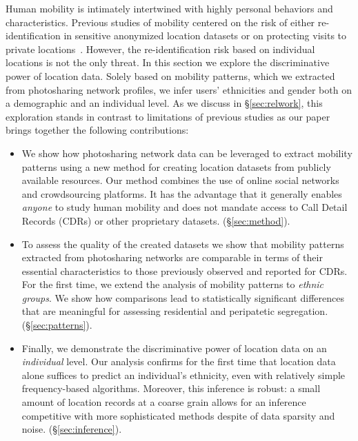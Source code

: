 Human mobility is intimately intertwined with highly personal behaviors and characteristics. 
Previous studies of mobility centered on the risk of either re-identification in sensitive anonymized location datasets or on protecting visits to private locations~\cite{de2013unique,Guha:2012ws}.
However, the re-identification risk based on individual locations is not the only threat. 
In this section we explore the discriminative power of location data. Solely based on mobility patterns, which we extracted from photosharing network profiles, we infer users' ethnicities and gender both on a demographic and an individual level. As we discuss in \S\ref{sec:relwork}, this exploration stands in contrast to limitations of previous studies as our paper brings together the following contributions:
\begin{itemize}
  \item We show how photosharing network data can be leveraged to extract mobility patterns using a new method for creating location datasets from publicly available resources. Our method combines the use of online social networks and crowdsourcing platforms. It has the advantage that it generally enables \emph{anyone} to study human mobility and does not mandate access to Call Detail Records (CDRs) or other proprietary datasets. (\S\ref{sec:method}).
  \item To assess the quality of the created datasets we show that mobility patterns extracted from photosharing networks are comparable in terms of their essential characteristics to those previously observed and reported for CDRs. For the first time, we extend the analysis of mobility patterns to \emph{ethnic groups}. We show how comparisons lead to statistically significant differences that are meaningful for assessing residential and peripatetic segregation. (\S\ref{sec:patterns}). 
  \item Finally, we demonstrate the discriminative power of location data on an \emph{individual} level. Our analysis confirms for the first time that location data alone suffices to predict an individual's ethnicity, even with relatively simple frequency-based algorithms. Moreover, this inference is robust: a small amount of location records at a coarse grain allows for an inference competitive with more sophisticated methods despite of data sparsity and noise. (\S\ref{sec:inference}).
\end{itemize}

